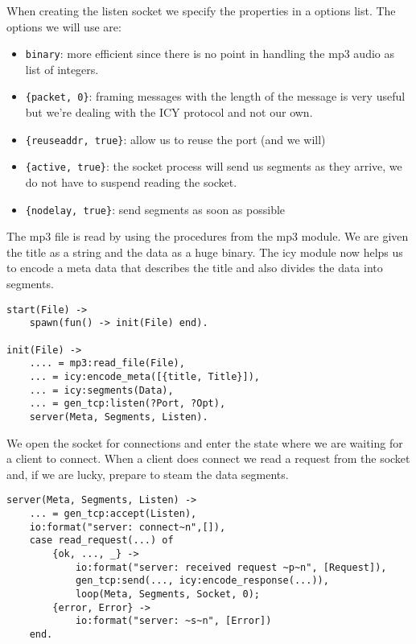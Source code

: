 \documentclass[a4paper,dvips,11pt]{article}
\begin{document}
When creating the listen socket we specify the properties in a options
list. The options we will use are:

\begin{itemize}

\item {\tt binary}: more efficient since there is no point in handling
  the mp3 audio as list of integers.

\item {\tt \{packet, 0\}}: framing messages with the length of the
  message is very useful but we're dealing with the ICY protocol and not our own.

\item {\tt \{reuseaddr, true\}}: allow us to reuse the port (and we will) 

\item {\tt \{active, true\}}: the socket process will send us segments
  as they arrive, we do not have to suspend reading the socket.

\item {\tt \{nodelay, true\}}: send segments as soon as possible

\end{itemize}

The mp3 file is read by using the procedures from the mp3 module. We
are given the title as a string and the data as a huge binary. The icy
module now helps us to encode a meta data that describes the title and
also divides the data into segments.

\begin{verbatim}
start(File) ->
    spawn(fun() -> init(File) end).

init(File) ->
    .... = mp3:read_file(File),
    ... = icy:encode_meta([{title, Title}]),
    ... = icy:segments(Data),
    ... = gen_tcp:listen(?Port, ?Opt),
    server(Meta, Segments, Listen).
\end{verbatim}

We open the socket for connections and enter the state where we are
waiting for a client to connect. When a client does connect we read a
request from the socket and, if we are lucky, prepare to steam the
data segments.

\begin{verbatim}
server(Meta, Segments, Listen) ->
    ... = gen_tcp:accept(Listen),
    io:format("server: connect~n",[]),
    case read_request(...) of
        {ok, ..., _} ->
            io:format("server: received request ~p~n", [Request]),
            gen_tcp:send(..., icy:encode_response(...)),
            loop(Meta, Segments, Socket, 0);
        {error, Error} ->
            io:format("server: ~s~n", [Error])
    end.
\end{verbatim}
\end{document}
